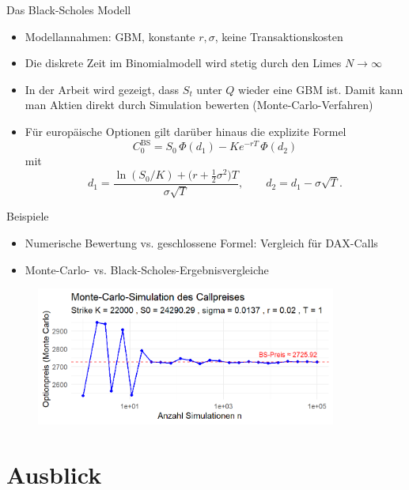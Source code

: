 \documentclass{beamer}
\begin{document}
\begin{frame}{Das Black-Scholes Modell}
  \begin{itemize}
      \item Modellannahmen: GBM, konstante $r,\sigma$, keine Transaktionskosten
      \item Die diskrete Zeit im Binomialmodell wird stetig durch den Limes $N \to \infty$
      \item In der Arbeit wird gezeigt, dass $S_t$ unter $Q$ wieder eine GBM ist. Damit kann man Aktien direkt durch Simulation bewerten (Monte-Carlo-Verfahren)
      \item Für europäische Optionen gilt darüber hinaus die explizite Formel
      $$C_0^{\mathrm{BS}}= S_0\,\Phi(d_1) - K e^{-rT}\,\Phi(d_2)$$ mit
      $$
d_1 = \frac{\ln(S_0/K) + \big(r + \tfrac12 \sigma^2\big)T}{\sigma \sqrt{T}},
\qquad
d_2 = d_1 - \sigma \sqrt{T}.
$$
  \end{itemize}
\end{frame}

\begin{frame}{Beispiele}
  \begin{itemize}
      \item Numerische Bewertung vs. geschlossene Formel: Vergleich für DAX-Calls
      \item Monte-Carlo- vs. Black-Scholes-Ergebnisvergleiche
  \end{itemize}
  \begin{figure}
    \centering
  \includegraphics[width=0.88\textwidth]{../thesis/images/call_dax_mc.png}
  \end{figure}
\end{frame}

\section{Ausblick}
\end{document}
